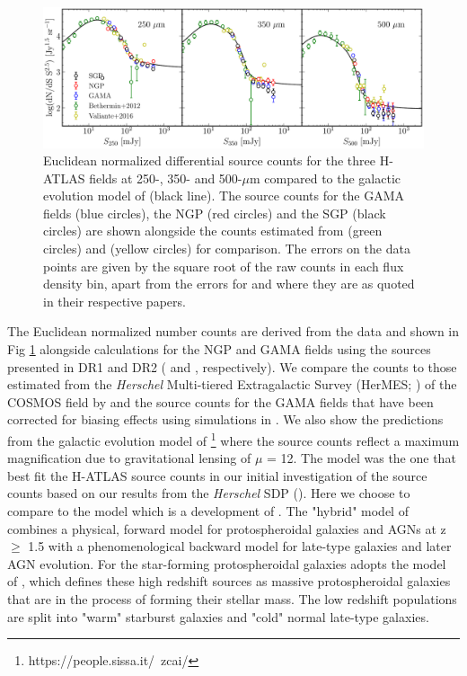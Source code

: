 \documentclass[fleqn,usenatbib]{mnras}
\begin{document}
\begin{figure}
	\includegraphics[width=\textwidth]{Fig_8}
	\caption{Euclidean normalized differential source counts for the three H-ATLAS fields at 250-, 350- and 500-$\mu$m compared to the galactic evolution model of \citealt{Cai_2013} (black line). The source counts for the GAMA fields (blue circles), the NGP (red circles) and the SGP (black circles) are shown alongside the counts estimated from \protect\citealt{Bethermin_2012} (green circles) and \protect\citealt{Valiante_2016} (yellow circles) for comparison. The errors on the data points are given by the square root of the raw counts in each flux density bin, apart from the errors for \protect\cite{Bethermin_2012} and \protect\citealt{Valiante_2016} where they are as quoted in their respective papers.} 
	\label{fig:model_comparison}
\end{figure}

The Euclidean normalized number counts are derived from the data and shown in Fig \ref{fig:model_comparison} alongside calculations for the NGP and GAMA fields using the sources presented in DR1 and DR2 (\citealt{Valiante_2016} and \citealt{Maddox_2018}, respectively). We compare the counts to those estimated from the \textit{Herschel} Multi-tiered Extragalactic Survey (HerMES; \citealt{Oliver_2012}) of the COSMOS field by \citealt{Bethermin_2012} and the source counts for the GAMA fields that have been corrected for biasing effects using simulations in \citealt{Valiante_2016}. We also show the predictions from the galactic evolution model of \citealt{Cai_2013}\footnote{https://people.sissa.it/~zcai/} where the source counts reflect a maximum magnification due to gravitational lensing of $\mu$ = 12. The \citealt{Negrello_2007} model was the one that best fit the H-ATLAS source counts in our initial investigation of the source counts based on our results from the \textit{Herschel} SDP (\citealt{Clements_2010}). Here we choose to compare to the \citealt{Cai_2013} model which is a development of \citealt{Negrello_2007}. The "hybrid" model of \citealt{Cai_2013} combines a physical, forward model for protospheroidal galaxies and AGNs at z $\geq$ 1.5 with a phenomenological backward model for late-type galaxies and later AGN evolution. For the star-forming protospheroidal galaxies \citealt{Cai_2013} adopts the model of \citealt{Granato_2004}, which defines these high redshift sources as massive protospheroidal galaxies that are in the process of forming their stellar mass. The low redshift populations are split into "warm" starburst galaxies and "cold" normal late-type galaxies.
\end{document}
